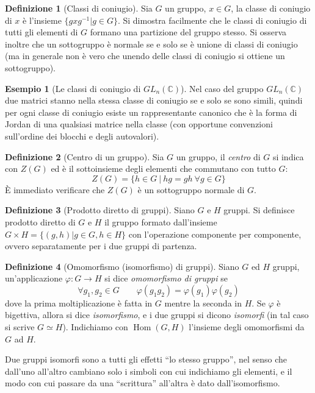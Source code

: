 \documentclass[11pt]{article}
\theoremstyle{plain}
\theoremstyle{definition}
\newtheorem{defn}{Definizione}[section]
\newtheorem{exmp}{Esempio}[section]
\theoremstyle{remark}
\newcommand{\C}{\mathbb{C}}
\DeclareMathOperator{\Hom}{Hom}
\DeclareMathOperator{\iso}{\simeq}
\begin{document}
\begin{defn}[Classi di coniugio]
Sia $G$ un gruppo, $x \in G$, la classe di coniugio di $x$ è l'insieme $\{ gxg^{-1} | g\in G \}$. Si dimostra facilmente che le classi di coniugio di tutti gli elementi di $G$ formano una partizione del gruppo stesso. Si osserva inoltre che un sottogruppo è normale se e solo se è unione di classi di coniugio (ma in generale non è vero che unendo delle classi di coniugio si ottiene un sottogruppo).
\end{defn}
\begin{exmp}[Le classi di coniugio di $GL_n(\C)$]
Nel caso del gruppo $GL_n(\C)$ due matrici stanno nella stessa classe di coniugio se e solo se sono simili, quindi per ogni classe di coniugio esiste un rappresentante canonico che è la forma di Jordan di una qualsiasi matrice nella classe (con opportune convenzioni sull'ordine dei blocchi e degli autovalori).
\end{exmp}

\begin{defn}[Centro di un gruppo]
	Sia $G$ un gruppo, il \emph{centro} di $G$ si indica con $Z(G)$ ed è il sottoinsieme degli elementi che commutano con tutto $G$:
	\[Z(G)=\{ h\in G\ |\ hg=gh\ \forall g\in G \}\]
	\`E immediato verificare che $Z(G)$ è un sottogruppo normale di $G$.
\end{defn}

\begin{defn}[Prodotto diretto di gruppi]
Siano $G$ e $H$ gruppi. Si definisce prodotto diretto di $G$ e $H$ il gruppo formato dall'insieme $G \times H = \{ (g, h) | g \in G, h \in H\}$ con l'operazione componente per componente, ovvero separatamente per i due gruppi di partenza.
\end{defn}


\begin{defn}[Omomorfismo (isomorfismo) di gruppi]
Siano $G$ ed $H$ gruppi, un'applicazione $\varphi:G\to H$ si dice \textit{omomorfismo di gruppi} se
\[\forall g_1,g_2\in G\qquad \varphi(g_1 g_2)=\varphi(g_1)\varphi(g_2)\]
dove la prima moltiplicazione è fatta in $G$ mentre la seconda in $H$.
Se $\varphi$ è bigettiva, allora si dice \emph{isomorfismo}, e i due gruppi si dicono \emph{isomorfi} (in tal caso si scrive $G\iso H$).
Indichiamo con $\Hom(G,H)$ l'insieme degli omomorfismi da $G$ ad $H$.
\end{defn}

Due gruppi isomorfi sono a tutti gli effetti ``lo stesso gruppo'', nel senso che dall'uno all'altro cambiano
solo i simboli con cui indichiamo gli elementi, e il modo con cui passare da una ``scrittura'' all'altra è dato dall'isomorfismo.
\end{document}
